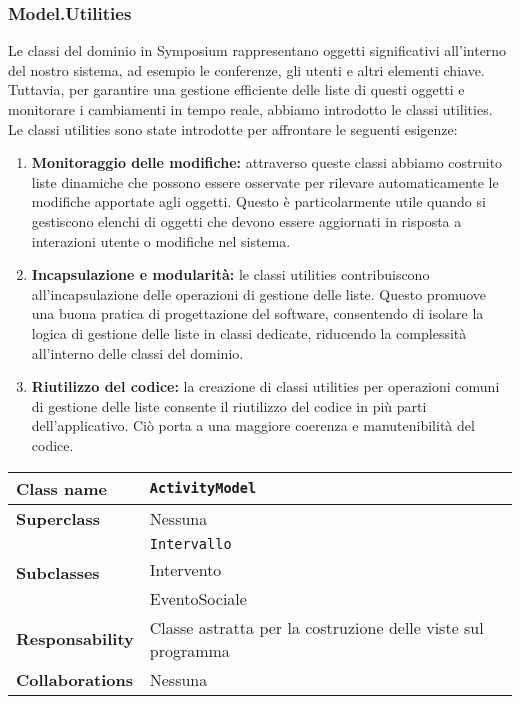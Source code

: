 \subsubsection{Model.Utilities}
Le classi del dominio in Symposium rappresentano oggetti significativi all'interno del nostro sistema, ad esempio le conferenze, gli utenti e altri elementi chiave. Tuttavia, per garantire una gestione efficiente delle liste di questi oggetti e monitorare i cambiamenti in tempo reale, abbiamo introdotto le classi utilities. Le classi utilities sono state introdotte per affrontare le seguenti esigenze:
\begin{enumerate}
	\item \textbf{Monitoraggio delle modifiche:} attraverso queste classi abbiamo costruito liste dinamiche che possono essere osservate per rilevare automaticamente le modifiche apportate agli oggetti. Questo è particolarmente utile quando si gestiscono elenchi di oggetti che devono essere aggiornati in risposta a interazioni utente o modifiche nel sistema.
	\item \textbf{Incapsulazione e modularità:} le classi utilities contribuiscono all'incapsulazione delle operazioni di gestione delle liste. Questo promuove una buona pratica di progettazione del software, consentendo di isolare la logica di gestione delle liste in classi dedicate, riducendo la complessità all'interno delle classi del dominio.
	\item \textbf{Riutilizzo del codice:} la creazione di classi utilities per operazioni comuni di gestione delle liste consente il riutilizzo del codice in più parti dell'applicativo. Ciò porta a una maggiore coerenza e manutenibilità del codice.
\end{enumerate}
\begin{table}[h!]
	\begin{tabular}{|l|l|}
		\hline 
		\textbf{Class name} & \texttt{ActivityModel}
		\\ \hline
		\textbf{Superclass} & Nessuna
		\\ \hline
		\multirow{3}{*}{\textbf{Subclasses}} & \texttt{Intervallo} \\
		& Intervento \\
		& EventoSociale \\ \hline
		\textbf{Responsability} & Classe astratta per la costruzione delle viste sul programma
		\\ \hline
		\multirow{1}{*}{\textbf{Collaborations}} & Nessuna
		\\ \hline
	\end{tabular}
\end{table}

